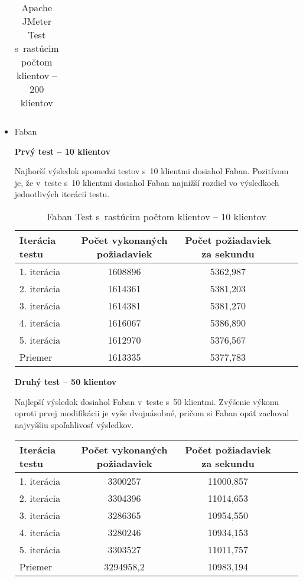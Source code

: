\documentclass[12pt,oneside,final]{fithesis-utf8}
\begin{document}
\begin{itemize}
\begin{table}[H]
\begin{center}
\begin{tabular}{ | l | c | c | c | c |}
\end{tabular}
\end{center}
\caption{Apache JMeter Test s~rastúcim počtom klientov -- 200 klientov}
\end{table}

\item Faban

\textbf{Prvý test -- 10 klientov}

Najhorší výsledok spomedzi testov s~10 klientmi dosiahol Faban. Pozitívom je, že v~teste s~10 klientmi dosiahol Faban najnižší rozdiel vo výsledkoch jednotlivých iterácií testu.

\begin{table}[H]
\begin{center}
\begin{tabular}{ | l | c | c | c | c |}
		\hline
		 \textbf{Iterácia testu} & \textbf{Počet vykonaných požiadaviek} & \textbf{Počet požiadaviek za sekundu} \\ \hline
		 1. iterácia & 1608896 & 5362,987 \\ \hline
		 2. iterácia & 1614361 & 5381,203 \\ \hline
		 3. iterácia & 1614381 & 5381,270 \\ \hline
		 4. iterácia & 1616067 & 5386,890 \\ \hline
		 5. iterácia & 1612970 & 5376,567 \\ \hline
		 Priemer & 1613335 & 5377,783 \\ \hline
		 
\end{tabular}
\end{center}
\caption{Faban Test s~rastúcim počtom klientov -- 10 klientov}
\end{table}

\textbf{Druhý test -- 50 klientov}

Najlepší výsledok dosiahol Faban v~teste s~50 klientmi. Zvýšenie výkonu oproti prvej modifikácii je vyše dvojnásobné, pričom si Faban opäť zachoval najvyššiu spoľahlivosť výsledkov. 

\begin{table}[H]
\begin{center}
\begin{tabular}{ | l | c | c | c | c |}
		\hline
		 \textbf{Iterácia testu} & \textbf{Počet vykonaných požiadaviek} & \textbf{Počet požiadaviek za sekundu} \\ \hline
		 1. iterácia & 3300257 & 11000,857 \\ \hline
		 2. iterácia & 3304396 & 11014,653 \\ \hline
		 3. iterácia & 3286365 & 10954,550 \\ \hline
		 4. iterácia & 3280246 & 10934,153 \\ \hline
		 5. iterácia & 3303527 & 11011,757 \\ \hline
		 Priemer & 3294958,2 & 10983,194 \\ \hline
		 

\end{tabular}
\end{center}
\end{table}
\end{itemize}
\end{document}
